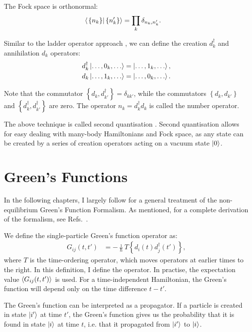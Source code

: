 The Fock space is orthonormal:
\begin{align*}
\braket{ \left. \left\{ n_k \right\} \right| \left\{ n_k' \right\}} &= \prod_{k} \delta_{n_k, n_k'}.
\end{align*}

Similar to the ladder operator approach \cite{griffiths}, we can define the creation $d^\dagger_k$ and annihilation $d_k$ operators:
\begin{align*}
d_k^\dagger \ket{\ldots, 0_k, \ldots} &=\ket{\ldots, 1_k, \ldots},\\
d_k \ket{\ldots, 1_k, \ldots} &=\ket{\ldots, 0_k, \ldots}.
\end{align*}

Note that the commutator $\left\{ d_k, d_{k'}^\dagger\right\} = \delta_{kk'}$, while the commutators $\left\{ d_k, d_{k'}\right\}$ and $\left\{ d_k^\dagger, d_{k'}^\dagger\right\}$ are zero. The operator $n_k = d_k^\dagger d_k$ is called the number operator. 

The above technique is called second quantisation \cite{yuli}. Second quantisation allows for easy dealing with many-body Hamiltonians and Fock space, as any state can be created by a series of creation operators acting on a vacuum state $\ket{0}$. 
 

\section{Green's Functions}
\label{sec:greensfunctions}
In the following chapters, I largely follow \citet{seldenthuis} for a general treatment of the non-equilibrium Green's Function Formalism. As mentioned, for a complete derivation of the formalism, see Refs.~\cite{mattuck,diventra,haugjauho}.

We define the single-particle Green's function operator as:
\begin{align}
G_{ij} (t,t') &= -\frac{\imath}{\hbar} T\left\{d_i(t)d_j^\dagger(t')\right\},
\label{eq:greensfunction}
\end{align}
where $T$ is the time-ordering operator, which moves operators at earlier times to the right. In this definition, I define the operator. In practise, the expectation value $\braket{G_{ij}(t,t')}$ is used. For a time-independent Hamiltonian, the Green's function will depend only on the time difference $t - t'$. 

The Green's function can be interpreted as a propagator. If a particle is created in state $\ket{i'}$ at time $t'$, the Green's function gives us the probability that it is found in state $\ket{i}$ at time $t$, i.e. that it propagated from $\ket{i'}$ to $\ket{i}$.

